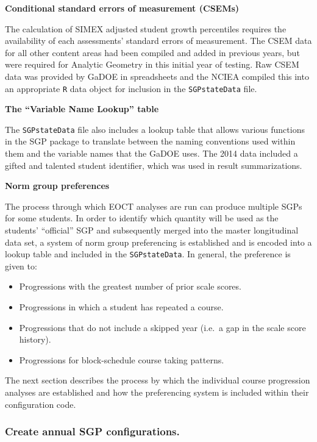 \documentclass[12pt]{article}
\begin{document}
\textbf{Conditional standard errors of measurement (CSEMs)}

The calculation of SIMEX adjusted student growth percentiles requires
the availability of each assessments' standard errors of measurement.
The CSEM data for all other content areas had been compiled and added in
previous years, but were required for Analytic Geometry in this initial
year of testing. Raw CSEM data was provided by GaDOE in spreadsheets and
the NCIEA compiled this into an appropriate \texttt{R} data object for
inclusion in the \texttt{SGPstateData} file.

\textbf{The ``Variable Name Lookup'' table}

The \texttt{SGPstateData} file also includes a lookup table that allows
various functions in the SGP package to translate between the naming
conventions used within them and the variable names that the GaDOE uses.
The 2014 data included a gifted and talented student identifier, which
was used in result summarizations.

\textbf{Norm group preferences}

The process through which EOCT analyses are run can produce multiple
SGPs for some students. In order to identify which quantity will be used
as the students' ``official'' SGP and subsequently merged into the
master longitudinal data set, a system of norm group preferencing is
established and is encoded into a lookup table and included in the
\texttt{SGPstateData}. In general, the preference is given to:

\begin{itemize}
\itemsep1pt\parskip0pt
\item
  Progressions with the greatest number of prior scale scores.
\item
  Progressions in which a student has repeated a course.
\item
  Progressions that do not include a skipped year (i.e.~a gap in the
  scale score history).
\item
  Progressions for block-schedule course taking patterns.
\end{itemize}

The next section describes the process by which the individual course
progression analyses are established and how the preferencing system is
included within their configuration code.

\subsubsection{Create annual SGP
configurations.}\label{create-annual-sgp-configurations.}
\end{document}
